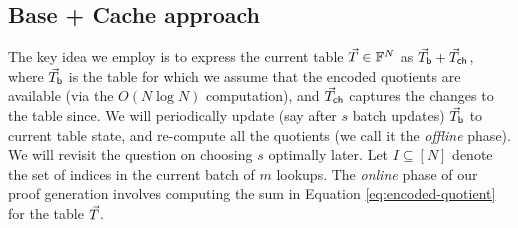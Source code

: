 \subsection{Base + Cache approach}\label{subsec:base-cache}
The key idea we employ is to express the current table $\vec{T}\in \mathbb{F}^N$ as $\vec{T}_{\mathsf{b}} + \vec{T}_{\mathsf{ch}}$, where $\vec{T}_{\mathsf{b}}$ is the table for which we assume that
the encoded quotients are available (via the $O(N\log N)$ computation), and $\vec{T}_{\mathsf{ch}}$ captures the changes to the table since. We will periodically update (say
after $s$ batch updates) $\vec{T}_{\mathsf{b}}$ to current table state, and re-compute all the quotients (we call it the {\em offline} phase).
We will revisit the question on choosing $s$ optimally later. Let $I\subseteq [N]$ denote the set of indices in the current batch of $m$ lookups. The {\em online}
phase of our proof generation involves computing the sum in Equation \eqref{eq:encoded-quotient} for the table $\vec{T}$.

